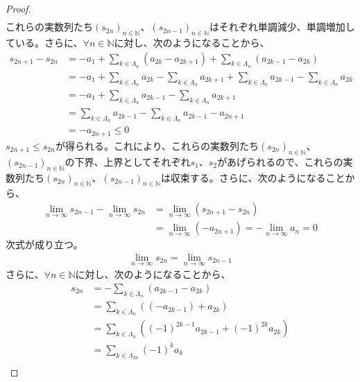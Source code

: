 \documentclass[dvipdfmx]{jsarticle}
\begin{document}
\begin{proof}
\begin{align*}
\end{align*}
これらの実数列たち$\left( s_{2n} \right)_{n \in \mathbb{N}}$、$\left( s_{2n - 1} \right)_{n \in \mathbb{N}}$はそれぞれ単調減少、単調増加している。さらに、$\forall n \in \mathbb{N}$に対し、次のようになることから、
\begin{align*}
s_{2n + 1} - s_{2n} &= - a_{1} + \sum_{k \in \varLambda_{n}} \left( a_{2k} - a_{2k + 1} \right) + \sum_{k \in \varLambda_{n}} \left( a_{2k - 1} - a_{2k} \right)\\
&= - a_{1} + \sum_{k \in \varLambda_{n}} a_{2k} - \sum_{k \in \varLambda_{n}} a_{2k + 1} + \sum_{k \in \varLambda_{n}} a_{2k - 1} - \sum_{k \in \varLambda_{n}} a_{2k}\\
&= - a_{1} + \sum_{k \in \varLambda_{n}} a_{2k - 1} - \sum_{k \in \varLambda_{n}} a_{2k + 1}\\
&= \sum_{k \in \varLambda_{n}} a_{2k - 1} - \sum_{k \in \varLambda_{n}} a_{2k - 1} - a_{2n + 1}\\
&= - a_{2n + 1} \leq 0
\end{align*}
$s_{2n + 1} \leq s_{2n}$が得られる。これにより、これらの実数列たち$\left( s_{2n} \right)_{n \in \mathbb{N}}$、$\left( s_{2n - 1} \right)_{n \in \mathbb{N}}$の下界、上界としてそれぞれ$s_{1}$、$s_{2}$があげられるので、これらの実数列たち$\left( s_{2n} \right)_{n \in \mathbb{N}}$、$\left( s_{2n - 1} \right)_{n \in \mathbb{N}}$は収束する。さらに、次のようになることから、
\begin{align*}
\lim_{n \rightarrow \infty}s_{2n - 1} - \lim_{n \rightarrow \infty}s_{2n} &= \lim_{n \rightarrow \infty}\left( s_{2n + 1} - s_{2n} \right)\\
&= \lim_{n \rightarrow \infty}\left( - a_{2n + 1} \right) = - \lim_{n \rightarrow \infty}a_{n} = 0
\end{align*}
次式が成り立つ。
\begin{align*}
\lim_{n \rightarrow \infty}s_{2n} = \lim_{n \rightarrow \infty}s_{2n - 1}
\end{align*}
さらに、$\forall n \in \mathbb{N}$に対し、次のようになることから、
\begin{align*}
s_{2n} &= - \sum_{k \in \varLambda_{n}} \left( a_{2k - 1} - a_{2k} \right)\\
&= \sum_{k \in \varLambda_{n}} \left( \left( - a_{2k - 1} \right) + a_{2k} \right)\\
&= \sum_{k \in \varLambda_{n}} \left( ( - 1)^{2k - 1}a_{2k - 1} + ( - 1)^{2k}a_{2k} \right)\\
&= \sum_{k \in \varLambda_{2n}} {( - 1)^{k}a_{k}}\\

\end{align*}
\end{proof}
\end{document}
